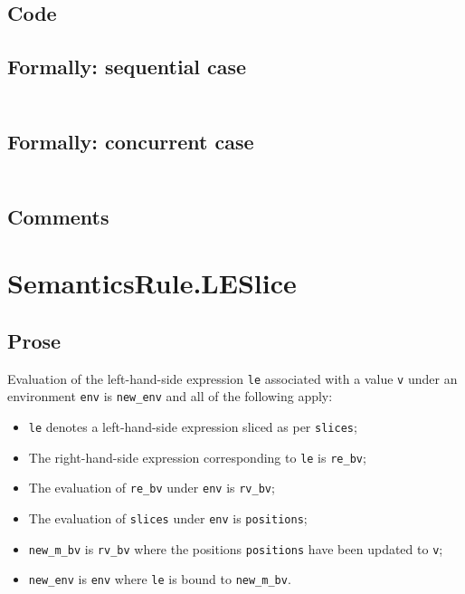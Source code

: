 \documentclass{book}
\begin{document}
  \subsection{Code}

  \subsection{Formally: sequential case}
  \begin{align}
  \end{align} 

  \subsection{Formally: concurrent case}
  \begin{align}
  \end{align} 

    \subsection{Comments}

\section{SemanticsRule.LESlice \label{sec:SemanticsRule.LESlice}}

    \subsection{Prose}
    Evaluation of the left-hand-side expression \texttt{le} associated with a
value \texttt{v} under an environment \texttt{env} is \texttt{new\_env} and all
of the following apply:
    \begin{itemize}
    \item \texttt{le} denotes a left-hand-side expression sliced as per \texttt{slices};
    \item The right-hand-side expression corresponding to \texttt{le} is \texttt{re\_bv};
    \item The evaluation of \texttt{re\_bv} under \texttt{env} is \texttt{rv\_bv};
    \item The evaluation of \texttt{slices} under \texttt{env} is \texttt{positions};
    \item \texttt{new\_m\_bv} is \texttt{rv\_bv} where the positions \texttt{positions} have been updated to \texttt{v};
    \item \texttt{new\_env} is \texttt{env} where \texttt{le} is bound to \texttt{new\_m\_bv}.
    \end{itemize}
\end{document}
